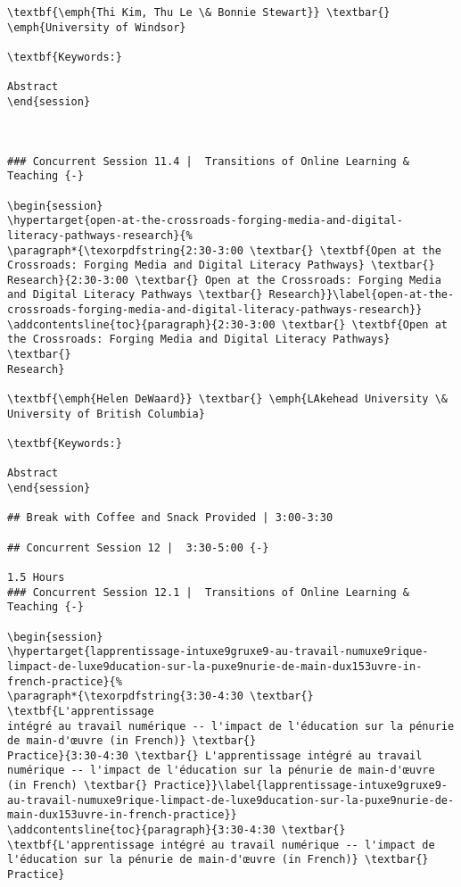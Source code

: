\documentclass[
]{book}
\begin{document}
\begin{verbatim}
\textbf{\emph{Thi Kim, Thu Le \& Bonnie Stewart}} \textbar{}
\emph{University of Windsor}

\textbf{Keywords:}

Abstract
\end{session}



### Concurrent Session 11.4 |  Transitions of Online Learning & Teaching {-}

\begin{session}
\hypertarget{open-at-the-crossroads-forging-media-and-digital-literacy-pathways-research}{%
\paragraph*{\texorpdfstring{2:30-3:00 \textbar{} \textbf{Open at the
Crossroads: Forging Media and Digital Literacy Pathways} \textbar{}
Research}{2:30-3:00 \textbar{} Open at the Crossroads: Forging Media and Digital Literacy Pathways \textbar{} Research}}\label{open-at-the-crossroads-forging-media-and-digital-literacy-pathways-research}}
\addcontentsline{toc}{paragraph}{2:30-3:00 \textbar{} \textbf{Open at
the Crossroads: Forging Media and Digital Literacy Pathways} \textbar{}
Research}

\textbf{\emph{Helen DeWaard}} \textbar{} \emph{LAkehead University \&
University of British Columbia}

\textbf{Keywords:}

Abstract
\end{session}

## Break with Coffee and Snack Provided | 3:00-3:30

## Concurrent Session 12 |  3:30-5:00 {-}

1.5 Hours
### Concurrent Session 12.1 |  Transitions of Online Learning & Teaching {-}

\begin{session}
\hypertarget{lapprentissage-intuxe9gruxe9-au-travail-numuxe9rique-limpact-de-luxe9ducation-sur-la-puxe9nurie-de-main-dux153uvre-in-french-practice}{%
\paragraph*{\texorpdfstring{3:30-4:30 \textbar{} \textbf{L'apprentissage
intégré au travail numérique -- l'impact de l'éducation sur la pénurie
de main-d'œuvre (in French)} \textbar{}
Practice}{3:30-4:30 \textbar{} L'apprentissage intégré au travail numérique -- l'impact de l'éducation sur la pénurie de main-d'œuvre (in French) \textbar{} Practice}}\label{lapprentissage-intuxe9gruxe9-au-travail-numuxe9rique-limpact-de-luxe9ducation-sur-la-puxe9nurie-de-main-dux153uvre-in-french-practice}}
\addcontentsline{toc}{paragraph}{3:30-4:30 \textbar{}
\textbf{L'apprentissage intégré au travail numérique -- l'impact de
l'éducation sur la pénurie de main-d'œuvre (in French)} \textbar{}
Practice}


\end{verbatim}
\end{document}
